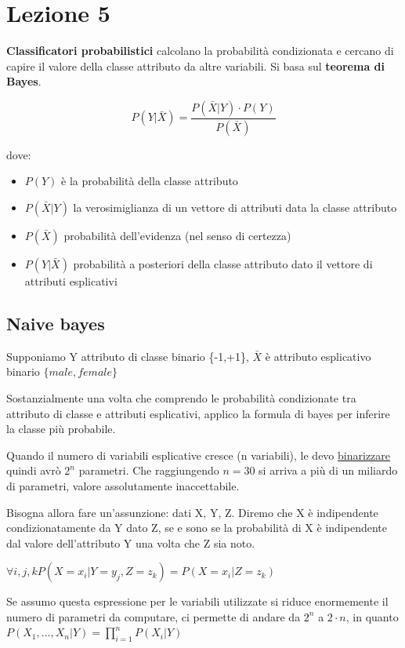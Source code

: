 \section{Lezione 5}

\textbf{Classificatori probabilistici} calcolano la probabilit\`a condizionata e cercano di capire il valore della classe attributo da altre variabili. Si basa sul \textbf{teorema di Bayes}. 

\[P(Y|\bar{X}) = \frac{P(\bar{X}|Y) \cdot P(Y)}{P(\bar{X})}\]

dove:
\begin{itemize}
	\item $P(Y)$ è la probabilit\`a della classe attributo
	\item $P(\bar{X}|Y)$ la verosimiglianza di un vettore di attributi data la classe attributo
	\item $P(\bar{X})$ probabilit\`a dell'evidenza (nel senso di certezza)
	\item $P(Y|\bar{X})$ probabilit\`a a posteriori della classe attributo dato il vettore di attributi esplicativi
\end{itemize}
\subsection{Naive bayes}
Supponiamo Y attributo di classe binario \{-1,+1\}, $\bar{X}$ \`e attributo esplicativo binario $\{male, female\}$

Sostanzialmente una volta che comprendo le probabilit\`a condizionate tra attributo di classe e attributi esplicativi, applico la formula di bayes per inferire la classe pi\`u probabile. 

Quando il numero di variabili esplicative cresce (n variabili), le devo \underline{binarizzare} quindi avr\`o $2^n$ parametri. Che raggiungendo $n=30$ si arriva a pi\`u di un miliardo di parametri, valore assolutamente inaccettabile.

Bisogna allora fare un'assunzione: dati X, Y, Z. Diremo che X \`e indipendente condizionatamente da Y dato Z, se e sono se la probabilit\`a di X è indipendente dal valore dell'attributo Y una volta che Z sia noto. 

$\forall i,j,k P(X=x_i|Y=y_j, Z=z_k) = P(X=x_i|Z=z_k)$

Se assumo questa espressione per le variabili utilizzate si riduce enormemente il numero di parametri da computare, ci permette di andare da $2^n$ a $2 \cdot n$, in quanto $P(X_1, ..., X_n|Y) = \prod_{i=1}^n P(X_i|Y)$

